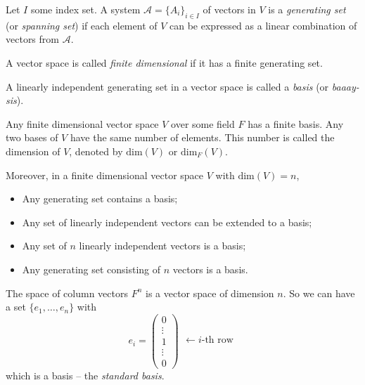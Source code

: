 \begin{definition}
	Let $I$ some index set. A system $\mathcal{A} = \{A_i\}_{i \in I}$ of vectors in $V$ is a \emph{generating set} (or \emph{spanning set}) if each element of $V$ can be expressed as a linear combination of vectors from $\mathcal{A}$.
	
	A vector space is called \emph{finite dimensional} if it has a finite generating set.
\end{definition}

\begin{definition}
	A linearly independent generating set in a vector space is called a \emph{basis} (or \emph{baaay-sis}).
\end{definition}

\begin{theorem}
	Any finite dimensional vector space $V$ over some field $F$ has a finite basis. Any two bases of $V$ have the same number of elements. This number is called the dimension of $V$, denoted by $\text{dim}(V)$ or $\text{dim}_F(V)$.
\end{theorem}

Moreover, in a finite dimensional vector space $V$ with $\text{dim}(V) = n$,
\begin{itemize}
	\item Any generating set contains a basis;
	\item Any set of linearly independent vectors can be extended to a basis;
	\item Any set of $n$ linearly independent vectors is a basis;
	\item Any generating set consisting of $n$ vectors is a basis.
\end{itemize}

\begin{example}
	The space of column vectors $F^n$ is a vector space of dimension $n$. So we can have a set $\{e_1, \ldots, e_n\}$ with
	\[
		e_i =
		\begin{pmatrix}
			0 \\
			\vdots \\
			1 \\
			\vdots \\
			0
		\end{pmatrix}
		\begin{matrix}
			 \\
			 \\
			\leftarrow i\text{-th row} \\
			 \\
			 \\
		\end{matrix}
	\]
	which is a basis -- the \emph{standard basis}.
\end{example}
